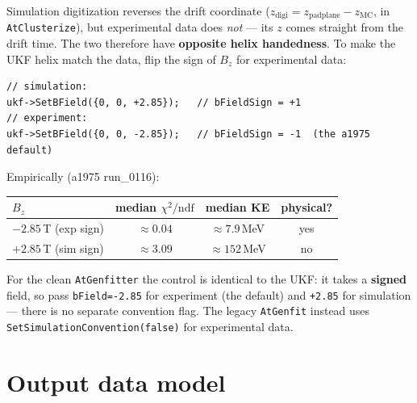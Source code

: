 \documentclass[11pt,a4paper]{article}
\newcommand{\code}[1]{\texttt{\small #1}}
\begin{document}
Simulation digitization reverses the drift coordinate
($z_\mathrm{digi} = z_\mathrm{pad plane} - z_\mathrm{MC}$, in \code{AtClusterize}),
but experimental data does \emph{not} --- its $z$ comes straight from the drift
time. The two therefore have \textbf{opposite helix handedness}. To make the UKF
helix match the data, flip the sign of $B_z$ for experimental data:

\begin{lstlisting}
// simulation:
ukf->SetBField({0, 0, +2.85});   // bFieldSign = +1
// experiment:
ukf->SetBField({0, 0, -2.85});   // bFieldSign = -1  (the a1975 default)
\end{lstlisting}

Empirically (a1975 run\_0116):

\begin{center}
\begin{tabular}{@{}lccc@{}}
\toprule
$B_z$ & median $\chi^2/\mathrm{ndf}$ & median KE & physical? \\
\midrule
$-2.85$\,T (exp sign) & $\approx 0.04$ & $\approx 7.9$\,MeV & yes \\
$+2.85$\,T (sim sign) & $\approx 3.09$ & $\approx 152$\,MeV & no \\
\bottomrule
\end{tabular}
\end{center}

For the clean \code{AtGenfitter} the control is identical to the UKF: it takes a
\textbf{signed} field, so pass \code{bField=-2.85} for experiment (the default) and
\code{+2.85} for simulation --- there is no separate convention flag. The legacy
\code{AtGenfit} instead uses \code{SetSimulationConvention\allowbreak (false)} for experimental
data.

\section{Output data model}\label{sec:datamodel}
\end{document}
